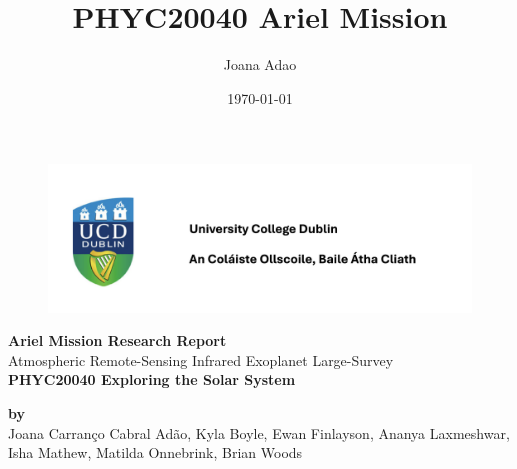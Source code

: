 \documentclass[12pt]{article}
\title{PHYC20040 Ariel Mission}
\author{Joana Adao}
\date{\today}
\begin{document}
\begin{titlepage}
    \begin{figure}[H]
        \includegraphics[width=.8\textwidth]{UCDLogo.png}
    \end{figure}

    \begin{center}
        \vspace{4cm}

        {\LARGE \bfseries Ariel Mission Research Report}\\
        \vspace{0.5cm}
        {\Large Atmospheric Remote-Sensing Infrared Exoplanet Large-Survey}\\
        \vspace{2cm}
        {\Large \textbf{PHYC20040 Exploring the Solar System}}\\
        
        \vspace{1cm}
    

    \vspace{2cm}
    
    {\large \textbf{by}}\\
    \vspace{.5cm}
    {\normalsize Joana Carranço Cabral Adão, Kyla Boyle, Ewan Finlayson, Ananya Laxmeshwar, Isha Mathew, Matilda Onnebrink, Brian Woods}\\

    \end{center}
    
   \clearpage

\end{titlepage}

\tableofcontents
\thispagestyle{empty}

\newpage


\thispagestyle{empty}
\end{document}
